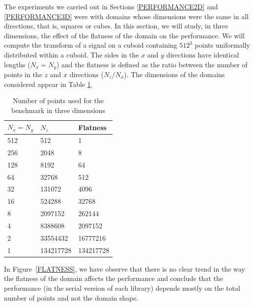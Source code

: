 \documentclass[12pt, a4paper]{article} \setlength{\textheight}{24cm}
\begin{document}
The experiments we carried out in Sections \ref{PERFORMANCE2D} and
\ref{PERFORMANCE3D} were with domains whose dimensions were the same
in all directions, that is, squares or cubes. In this section, we will
study, in three dimensions, the effect of the flatness of the domain
on the performance. We will compute the transform of a signal on a
cuboid containing $512^3$ points uniformally distributed within a
cuboid. The sides in the $x$ and $y$ directions have identical lengths
($N_x=N_y$) and the flatness is defined as the ratio between the
number of points in the $z$ and $x$ directions ($N_z/N_x$). The
dimensions of the domains considered appear in Table
\ref{FLATNESSDIM}.
\begin{table}[H]
  \centering
  \begin{tabular}{|l|l|l|}
    \hline
    $N_x=N_y$ & $N_z $ & Flatness\\ 
    \hline
    \hline
    512 & 512       & 1\\ \hline
    256 & 2048      & 8\\ \hline
    128 & 8192      & 64\\ \hline
    64  & 32768     & 512\\ \hline
    32  & 131072    & 4096\\ \hline
    16  & 524288    & 32768\\ \hline
    8   & 2097152   & 262144\\ \hline
    4   & 8388608   & 2097152\\ \hline
    2   & 33554432  & 16777216\\ \hline
    1   & 134217728 & 134217728\\ \hline
  \end{tabular}
  \caption{Number of points used for the benchmark in three dimensions}\label{FLATNESSDIM}
\end{table}

In Figure~\ref{FLATNESS}, we have observe that there is no clear trend
in the way the flatness of the domain affects the performance and
conclude that the performance (in the serial version of each library)
depends mostly on the total number of points and not the domain shape.
\end{document}
